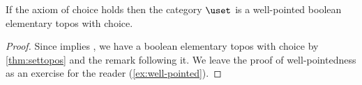 %
\begin{thm}\label{thm:ETCS}
  If the axiom of choice holds then the category $\uset$ is a well-pointed boolean elementary topos with choice.
\end{thm}

\begin{proof}
  Since \choice{} implies \LEM{}, we have a boolean elementary topos with choice by \cref{thm:settopos} and the remark following it.  We leave the proof of well-pointedness as
an exercise for the reader (\cref{ex:well-pointed}).
\end{proof}
